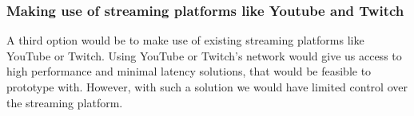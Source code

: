 

\subsubsection{Making use of streaming platforms like Youtube and Twitch}
A third option would be to make use of existing streaming platforms like YouTube or Twitch. Using YouTube or Twitch's network would give us access to high performance and minimal latency solutions, that would be feasible to prototype with. However, with such a solution we would have limited control over the streaming platform.


        

